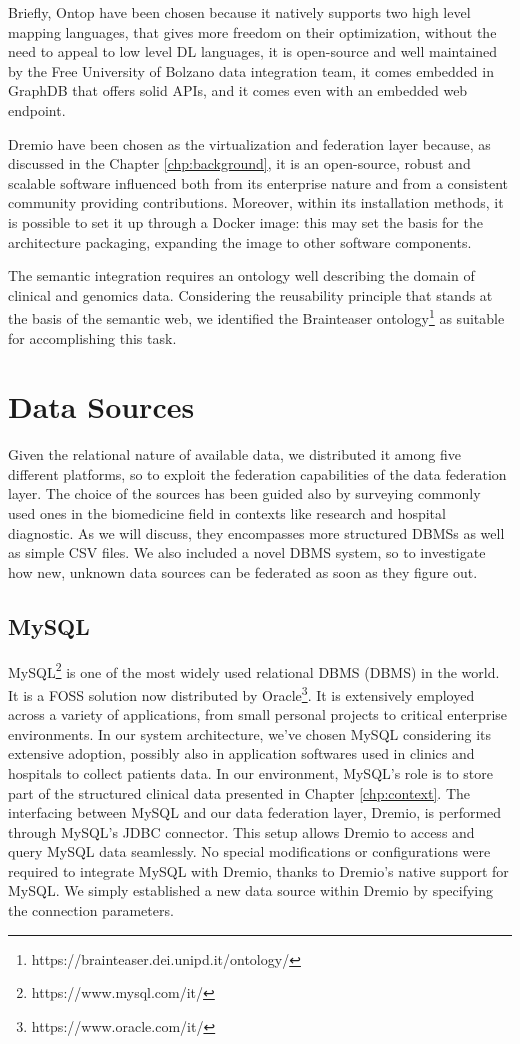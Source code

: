 Briefly, Ontop have been chosen because it natively supports two high level mapping languages, that gives more freedom on their optimization, without the need to appeal to low level \ac{DL} languages, it is open-source and well maintained by the Free University of Bolzano data integration team, it comes embedded in GraphDB that offers solid \ac{API}s, and it comes even with an embedded web endpoint.

Dremio have been chosen as the virtualization and federation layer because, as discussed in the Chapter \ref{chp:background}, it is an open-source, robust and scalable software influenced both from its enterprise nature and from a consistent community providing contributions. Moreover, within its installation methods, it is possible to set it up through a Docker image: this may set the basis for the architecture packaging, expanding the image to other software components.

The semantic integration requires an ontology well describing the domain of clinical and genomics data. Considering the reusability principle that stands at the basis of the semantic web, we identified the Brainteaser ontology\footnote{https://brainteaser.dei.unipd.it/ontology/} as suitable for accomplishing this task. 

\section{Data Sources}
Given the relational nature of available data, we distributed it among five different platforms, so to exploit the federation capabilities of the data federation layer. The choice of the sources has been guided also by surveying commonly used ones in the biomedicine field in contexts like research and hospital diagnostic. As we will discuss, they encompasses more structured \ac{DBMS}s as well as simple \ac{CSV} files. We also included a novel \ac{DBMS} system, so to investigate how new, unknown data sources can be federated as soon as they figure out.

\subsection{MySQL}
MySQL\footnote{https://www.mysql.com/it/} is one of the most widely used relational \ac{DBMS} (DBMS) in the world. It is a \ac{FOSS} solution now distributed by Oracle\footnote{https://www.oracle.com/it/}. It is extensively employed across a variety of applications, from small personal projects to critical enterprise environments. In our system architecture, we've chosen MySQL considering its extensive adoption, possibly also in application softwares used in clinics and hospitals to collect patients data. 
In our environment, MySQL's role is to store part of the structured clinical data presented in Chapter \ref{chp:context}. 
The interfacing between MySQL and our data federation layer, Dremio, is performed through MySQL's JDBC connector. This setup allows Dremio to access and query MySQL data seamlessly.
No special modifications or configurations were required to integrate MySQL with Dremio, thanks to Dremio's native support for MySQL. We simply established a new data source within Dremio by specifying the connection parameters.

